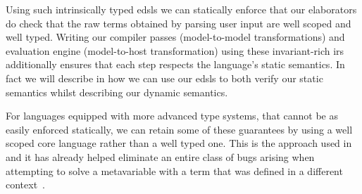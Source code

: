 \begin{center}
\end{center}


\noindent
Using such intrinsically typed \acp{edsl} we can statically enforce that
our elaborators do check that the raw terms obtained by parsing user input
are well scoped and well typed.
%
Writing our compiler passes (model-to-model transformations) and
evaluation engine (model-to-host transformation) using these
invariant-rich \acp{ir} additionally ensures that each step respects
the language's static semantics.
%
In fact we will describe in  how we can use our \acp{edsl}
to both verify our static semantics whilst describing our dynamic semantics.

For languages equipped with more advanced type systems, that cannot be as easily
enforced statically, we can retain some of these guarantees by using a well
scoped core language rather than a well typed one.
%
This is the approach used in \Idris{} and it has already helped eliminate an
entire class of bugs arising when attempting to solve a metavariable with a
term that was defined in a different context~\cite{DBLP:conf/ecoop/Brady21}.
